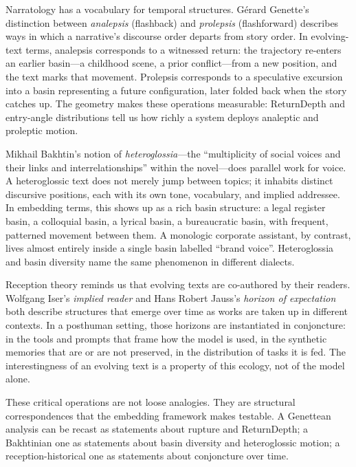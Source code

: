 \documentclass[12pt,a4paper]{article}
\begin{document}
Narratology has a vocabulary for temporal structures. G\'erard Genette's distinction between \emph{analepsis} (flashback) and \emph{prolepsis} (flashforward) describes ways in which a narrative's discourse order departs from story order.\cite{genette1980} In evolving-text terms, analepsis corresponds to a witnessed return: the trajectory re-enters an earlier basin---a childhood scene, a prior conflict---from a new position, and the text marks that movement. Prolepsis corresponds to a speculative excursion into a basin representing a future configuration, later folded back when the story catches up. The geometry makes these operations measurable: ReturnDepth and entry-angle distributions tell us how richly a system deploys analeptic and proleptic motion.

Mikhail Bakhtin's notion of \emph{heteroglossia}---the ``multiplicity of social voices and their links and interrelationships'' within the novel---does parallel work for voice.\cite{bakhtin1981} A heteroglossic text does not merely jump between topics; it inhabits distinct discursive positions, each with its own tone, vocabulary, and implied addressee. In embedding terms, this shows up as a rich basin structure: a legal register basin, a colloquial basin, a lyrical basin, a bureaucratic basin, with frequent, patterned movement between them. A monologic corporate assistant, by contrast, lives almost entirely inside a single basin labelled ``brand voice''. Heteroglossia and basin diversity name the same phenomenon in different dialects.

Reception theory reminds us that evolving texts are co-authored by their readers. Wolfgang Iser's \emph{implied reader} and Hans Robert Jauss's \emph{horizon of expectation} both describe structures that emerge over time as works are taken up in different contexts.\cite{iser1978,jauss1982} In a posthuman setting, those horizons are instantiated in conjoncture: in the tools and prompts that frame how the model is used, in the synthetic memories that are or are not preserved, in the distribution of tasks it is fed. The interestingness of an evolving text is a property of this ecology, not of the model alone.

These critical operations are not loose analogies. They are structural correspondences that the embedding framework makes testable. A Genettean analysis can be recast as statements about rupture and ReturnDepth; a Bakhtinian one as statements about basin diversity and heteroglossic motion; a reception-historical one as statements about conjoncture over time.
\end{document}
